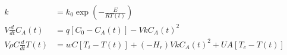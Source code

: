 \begin{equation}
  \begin{aligned}
    k                         & = k_0 \exp(-\frac{E}{RT(t)})
    \\
    V\frac{d}{dt}C_A(t)       & = q [C_0 - C_A(t)] - V k C_A(t)^2
    \\
    V \rho C \frac{d}{dt}T(t) & = w C [T_i - T(t)] + (- H_r) V k C_A(t)^2 + U A [T_c - T(t)]
  \end{aligned}
  \label{eq:CSTR_2ndorder01_1}
\end{equation}